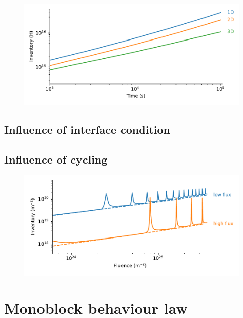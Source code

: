 \begin{figure}
    \centering
    \includegraphics[width=\linewidth]{Figures/Chapter3/monoblocks/3D_monoblocks/comparison_inventory_1d_2d_3d.pdf}
    \caption{}
\end{figure}

\subsection{Influence of interface condition}


\subsection{Influence of cycling}
\begin{figure}
    \centering
    \includegraphics[width=\linewidth]{Figures/Chapter3/monoblocks/comparison_inventory_cycling.pdf}
    \caption{}
\end{figure}

\section{Monoblock behaviour law} \label{influence of exposure conditions}



